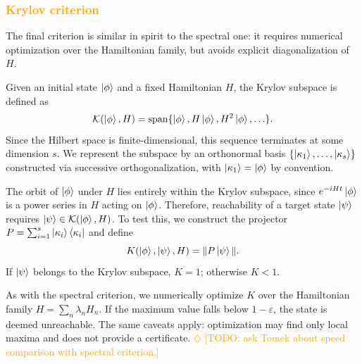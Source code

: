 \documentclass[aps,prx,reprint,superscriptaddress,footnote, twocolumn,notitlepage]{revtex4-2}
\newcommand{\ko}[1]{\textcolor{orange}{#1}}
\newcommand{\todoko}[1]{\ko{$\diamondsuit$ #1}}
\begin{document}
\subsubsection{\ko{Krylov criterion}}
The final criterion is similar in spirit to the spectral one: it requires numerical optimization over the Hamiltonian family, but avoids explicit diagonalization of $H$.

Given an initial state $\ket{\phi}$ and a fixed Hamiltonian $H$, the Krylov subspace is defined as
\begin{equation}
    \mathcal{K}(\ket{\phi}, H) = \mathrm{span}\{\ket{\phi}, H\ket{\phi}, H^2\ket{\phi}, \ldots\}.
\end{equation}
Since the Hilbert space is finite-dimensional, this sequence terminates at some dimension $s$. We represent the subspace by an orthonormal basis $\{\ket{\kappa_1}, \ldots, \ket{\kappa_s}\}$ constructed via successive orthogonalization, with $\ket{\kappa_1} = \ket{\phi}$ by convention.

The orbit of $\ket{\phi}$ under $H$ lies entirely within the Krylov subspace, since $e^{-iHt}\ket{\phi}$ is a power series in $H$ acting on $\ket{\phi}$. Therefore, reachability of a target state $\ket{\psi}$ requires $\ket{\psi} \in \mathcal{K}(\ket{\phi}, H)$. To test this, we construct the projector $P = \sum_{i=1}^{s} \ket{\kappa_i}\bra{\kappa_i}$ and define
\begin{equation}
    K(\ket{\phi}, \ket{\psi}, H) = \| P \ket{\psi} \|.
\end{equation}
If $\ket{\psi}$ belongs to the Krylov subspace, $K = 1$; otherwise $K < 1$.

As with the spectral criterion, we numerically optimize $K$ over the Hamiltonian family $H = \sum_n \lambda_n H_n$. If the maximum value falls below $1 - \varepsilon$, the state is deemed unreachable. The same caveats apply: optimization may find only local maxima and does not provide a certificate. \todoko{[TODO: ask Tomek about speed comparison with spectral criterion.]}
\end{document}
